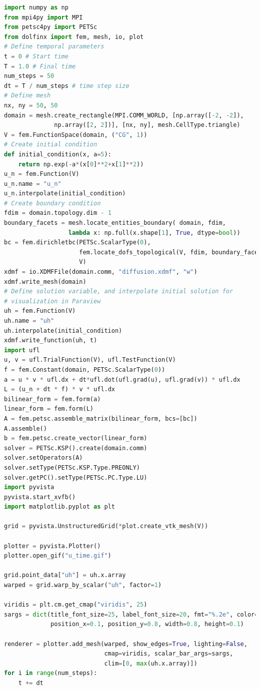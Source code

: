 \begin{appendices}
\begin{lstlisting}[language=Python, caption={The Heat Equation - Diffusion of a Gaussian Function}]
import numpy as np
from mpi4py import MPI
from petsc4py import PETSc
from dolfinx import fem, mesh, io, plot
# Define temporal parameters
t = 0 # Start time
T = 1.0 # Final time
num_steps = 50     
dt = T / num_steps # time step size
# Define mesh
nx, ny = 50, 50
domain = mesh.create_rectangle(MPI.COMM_WORLD, [np.array([-2, -2]),
              np.array([2, 2])], [nx, ny], mesh.CellType.triangle)
V = fem.FunctionSpace(domain, ("CG", 1))
# Create initial condition
def initial_condition(x, a=5):
    return np.exp(-a*(x[0]**2+x[1]**2))
u_n = fem.Function(V)
u_n.name = "u_n"
u_n.interpolate(initial_condition)
# Create boundary condition
fdim = domain.topology.dim - 1
boundary_facets = mesh.locate_entities_boundary( domain, fdim, 
                  lambda x: np.full(x.shape[1], True, dtype=bool))
bc = fem.dirichletbc(PETSc.ScalarType(0), 
                     fem.locate_dofs_topological(V, fdim, boundary_facets),
                     V)
xdmf = io.XDMFFile(domain.comm, "diffusion.xdmf", "w")
xdmf.write_mesh(domain)
# Define solution variable, and interpolate initial solution for 
# visualization in Paraview
uh = fem.Function(V)
uh.name = "uh"
uh.interpolate(initial_condition)
xdmf.write_function(uh, t)
import ufl
u, v = ufl.TrialFunction(V), ufl.TestFunction(V)
f = fem.Constant(domain, PETSc.ScalarType(0))
a = u * v * ufl.dx + dt*ufl.dot(ufl.grad(u), ufl.grad(v)) * ufl.dx 
L = (u_n + dt * f) * v * ufl.dx
bilinear_form = fem.form(a)
linear_form = fem.form(L)
A = fem.petsc.assemble_matrix(bilinear_form, bcs=[bc])
A.assemble()
b = fem.petsc.create_vector(linear_form)
solver = PETSc.KSP().create(domain.comm)
solver.setOperators(A)
solver.setType(PETSc.KSP.Type.PREONLY)
solver.getPC().setType(PETSc.PC.Type.LU)
import pyvista
pyvista.start_xvfb()
import matplotlib.pyplot as plt

grid = pyvista.UnstructuredGrid(*plot.create_vtk_mesh(V))

plotter = pyvista.Plotter()
plotter.open_gif("u_time.gif")

grid.point_data["uh"] = uh.x.array
warped = grid.warp_by_scalar("uh", factor=1)

viridis = plt.cm.get_cmap("viridis", 25)
sargs = dict(title_font_size=25, label_font_size=20, fmt="%.2e", color="black",
             position_x=0.1, position_y=0.8, width=0.8, height=0.1)

renderer = plotter.add_mesh(warped, show_edges=True, lighting=False,
                            cmap=viridis, scalar_bar_args=sargs,
                            clim=[0, max(uh.x.array)])
for i in range(num_steps):
    t += dt


\end{lstlisting}
\end{appendices}
